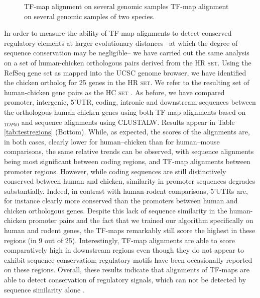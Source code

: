 \begin{figure}[t!]
\begin{center}
\setlength{\fboxsep}{0pt}
          {TF-map alignment on several genomic samples}%
          {TF-map alignment on several genomic samples of two species.}%
          {}
\end{center}
\end{figure}

In order to measure the ability of TF-map alignments
to detect conserved regulatory elements at larger
evolutionary distances --at which the degree of sequence
conservation may be negligible-- we have carried out the same analysis
on a set of human-chicken orthologous pairs derived from the \textsc{HR
set}.  Using the RefSeq gene set as mapped into the UCSC genome browser,
we have identified the chicken ortholog for 25 genes in the
\textsc{HR set}. We refer to the resulting set of human-chicken gene pairs as the
\textsc{HC set} \citep{blanco:2006b}. As before, we have compared
promoter, intergenic, 5'UTR, coding, intronic and downstream sequences
between the orthologous human-chicken genes using both TF-map
alignments based on $_{TOP50}$ and sequence alignments using CLUSTALW.
Results appear in Table \ref{tab:testregions} (Bottom). 
While, as expected, the scores of the alignments are, in both cases, clearly
lower for human--chicken than for human--mouse comparisons,
the same relative trends can be observed, with sequence alignments
being most significant between coding regions, and TF-map alignments
between promoter regions.
However, while coding sequences are still distinctively conserved
between human and chicken, similarity in promoter sequences degrades
substantially.  
Indeed, in contrast with human-rodent comparisons,  5'UTRs are, for
instance clearly more conserved than the promoters between human and chicken
orthologous genes. Despite this lack of sequence similarity in the
human-chicken promoter pairs and the fact that we trained our
algorithm specifically on human and rodent genes, 
the TF-maps remarkably still score the highest in these regions (in 9 out of 25).
Interestingly, TF-map alignments are able to score comparatively high 
in downstream regions even though they do not appear to exhibit
sequence conservation; regulatory
motifs have been occasionally reported on these regions.
Overall, these results indicate that alignments of TF-maps are able to detect
conservation of regulatory signals, which can not be detected by
sequence similarity alone \citep{blanco:2006b}.

